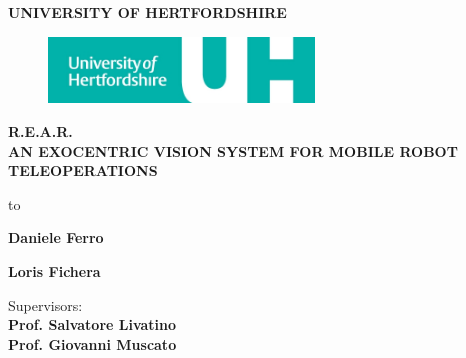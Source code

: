 \begin{titlepage}
  \begin{center}
    \textbf{\uppercase{University of HertfordShire}}\\
    
    
    \begin{figure}[!h]
      \begin{center}
        \includegraphics[width=200pt]{img/uni_logo.jpg}  %
      \end{center}
    \end{figure}
              
    \uppercase{ \textbf{
        \LARGE{R.E.A.R.} \\ 
        \vspace{0.5truecm}
        \large{an exocentric vision system for 
          mobile robot teleoperations}
      }}
              
    \vspace{7truecm}
    
    \hbox to \textwidth{\hrulefill}
    
    \vspace{1truecm}
    
    \begin{flushright}
      \textbf{Daniele Ferro} \\                
      \vspace{0.5truecm}
      
      \textbf{Loris Fichera} \\
      \vspace{1truecm}
                
      Supervisors:\\
      \textbf{Prof. Salvatore Livatino }\\
      \textbf{Prof. Giovanni Muscato}
                
    \end{flushright}
    
    \vspace{1truecm}
    
  \end{center}
  
\end{titlepage}

\setlength{\baselineskip}{1.3\baselineskip} %

\tableofcontents

\newpage
